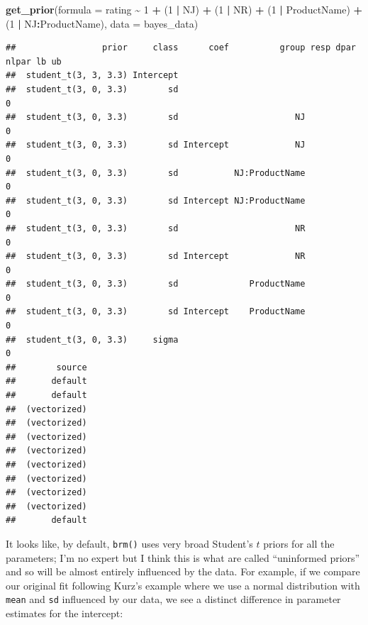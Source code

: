 \documentclass[
]{book}
\newenvironment{Shaded}{\begin{snugshade}}{\end{snugshade}}
\newcommand{\AttributeTok}[1]{\textcolor[rgb]{0.13,0.29,0.53}{#1}}
\newcommand{\DecValTok}[1]{\textcolor[rgb]{0.00,0.00,0.81}{#1}}
\newcommand{\FunctionTok}[1]{\textcolor[rgb]{0.13,0.29,0.53}{\textbf{#1}}}
\newcommand{\NormalTok}[1]{#1}
\newcommand{\SpecialCharTok}[1]{\textcolor[rgb]{0.81,0.36,0.00}{\textbf{#1}}}
\begin{document}
\begin{Shaded}
\begin{Highlighting}[]
\FunctionTok{get\_prior}\NormalTok{(}\AttributeTok{formula =}\NormalTok{ rating }\SpecialCharTok{\textasciitilde{}} \DecValTok{1} \SpecialCharTok{+}\NormalTok{ (}\DecValTok{1} \SpecialCharTok{|}\NormalTok{ NJ) }\SpecialCharTok{+}\NormalTok{ (}\DecValTok{1} \SpecialCharTok{|}\NormalTok{ NR) }\SpecialCharTok{+}\NormalTok{ (}\DecValTok{1} \SpecialCharTok{|}\NormalTok{ ProductName) }\SpecialCharTok{+}\NormalTok{ (}\DecValTok{1} \SpecialCharTok{|}\NormalTok{ NJ}\SpecialCharTok{:}\NormalTok{ProductName),}
          \AttributeTok{data =}\NormalTok{ bayes\_data)}
\end{Highlighting}
\end{Shaded}

\begin{verbatim}
##                 prior     class      coef          group resp dpar nlpar lb ub
##  student_t(3, 3, 3.3) Intercept                                               
##  student_t(3, 0, 3.3)        sd                                           0   
##  student_t(3, 0, 3.3)        sd                       NJ                  0   
##  student_t(3, 0, 3.3)        sd Intercept             NJ                  0   
##  student_t(3, 0, 3.3)        sd           NJ:ProductName                  0   
##  student_t(3, 0, 3.3)        sd Intercept NJ:ProductName                  0   
##  student_t(3, 0, 3.3)        sd                       NR                  0   
##  student_t(3, 0, 3.3)        sd Intercept             NR                  0   
##  student_t(3, 0, 3.3)        sd              ProductName                  0   
##  student_t(3, 0, 3.3)        sd Intercept    ProductName                  0   
##  student_t(3, 0, 3.3)     sigma                                           0   
##        source
##       default
##       default
##  (vectorized)
##  (vectorized)
##  (vectorized)
##  (vectorized)
##  (vectorized)
##  (vectorized)
##  (vectorized)
##  (vectorized)
##       default
\end{verbatim}

It looks like, by default, \texttt{brm()} uses very broad Student's \(t\) priors for all the parameters; I'm no expert but I think this is what are called ``uninformed priors'' and so will be almost entirely influenced by the data. For example, if we compare our original fit following Kurz's example where we use a normal distribution with \texttt{mean} and \texttt{sd} influenced by our data, we see a distinct difference in parameter estimates for the intercept:
\end{document}
